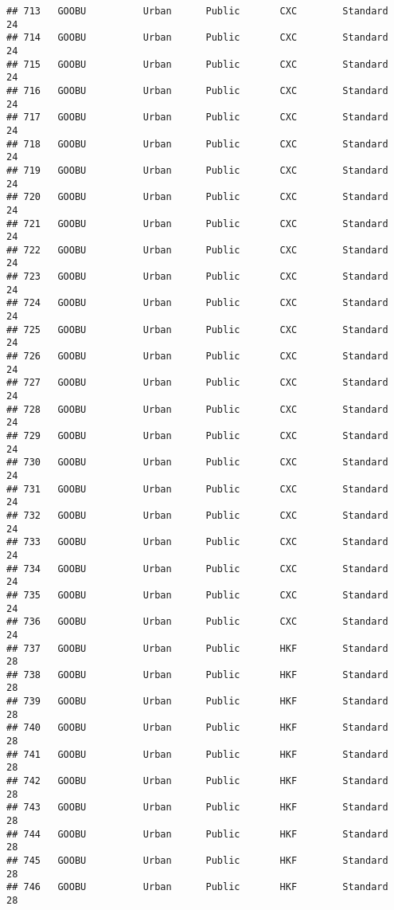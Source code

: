 \documentclass[
]{article}
\begin{document}
\begin{verbatim}
## 713   GOOBU          Urban      Public       CXC        Standard        24
## 714   GOOBU          Urban      Public       CXC        Standard        24
## 715   GOOBU          Urban      Public       CXC        Standard        24
## 716   GOOBU          Urban      Public       CXC        Standard        24
## 717   GOOBU          Urban      Public       CXC        Standard        24
## 718   GOOBU          Urban      Public       CXC        Standard        24
## 719   GOOBU          Urban      Public       CXC        Standard        24
## 720   GOOBU          Urban      Public       CXC        Standard        24
## 721   GOOBU          Urban      Public       CXC        Standard        24
## 722   GOOBU          Urban      Public       CXC        Standard        24
## 723   GOOBU          Urban      Public       CXC        Standard        24
## 724   GOOBU          Urban      Public       CXC        Standard        24
## 725   GOOBU          Urban      Public       CXC        Standard        24
## 726   GOOBU          Urban      Public       CXC        Standard        24
## 727   GOOBU          Urban      Public       CXC        Standard        24
## 728   GOOBU          Urban      Public       CXC        Standard        24
## 729   GOOBU          Urban      Public       CXC        Standard        24
## 730   GOOBU          Urban      Public       CXC        Standard        24
## 731   GOOBU          Urban      Public       CXC        Standard        24
## 732   GOOBU          Urban      Public       CXC        Standard        24
## 733   GOOBU          Urban      Public       CXC        Standard        24
## 734   GOOBU          Urban      Public       CXC        Standard        24
## 735   GOOBU          Urban      Public       CXC        Standard        24
## 736   GOOBU          Urban      Public       CXC        Standard        24
## 737   GOOBU          Urban      Public       HKF        Standard        28
## 738   GOOBU          Urban      Public       HKF        Standard        28
## 739   GOOBU          Urban      Public       HKF        Standard        28
## 740   GOOBU          Urban      Public       HKF        Standard        28
## 741   GOOBU          Urban      Public       HKF        Standard        28
## 742   GOOBU          Urban      Public       HKF        Standard        28
## 743   GOOBU          Urban      Public       HKF        Standard        28
## 744   GOOBU          Urban      Public       HKF        Standard        28
## 745   GOOBU          Urban      Public       HKF        Standard        28
## 746   GOOBU          Urban      Public       HKF        Standard        28

\end{verbatim}
\end{document}
